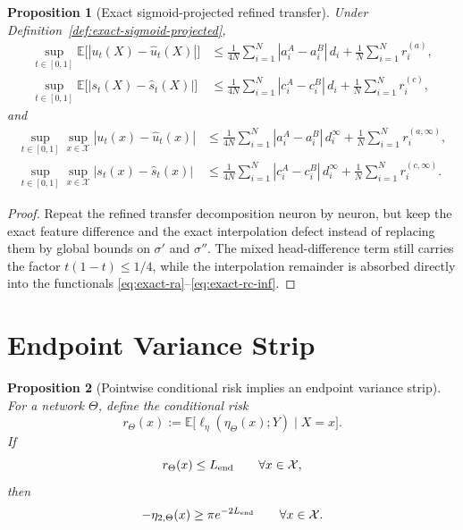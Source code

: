 \documentclass[11pt]{article}
\newtheorem{proposition}{Proposition}
\newcommand{\E}{\mathbb{E}}
\newcommand{\abs}[1]{\left\lvert #1 \right\rvert}
\begin{document}
\begin{proposition}[Exact sigmoid-projected refined transfer]
\label{prop:exact-sigmoid-projected-transfer}
Under Definition~\ref{def:exact-sigmoid-projected},
\begin{align}
  \sup_{t\in[0,1]}\E\big[\abs{u_t(X)-\hat u_t(X)}\big]
  &\le
  \frac{1}{4N}\sum_{i=1}^N \abs{a_i^A-a_i^B}\,d_i
  +
  \frac{1}{N}\sum_{i=1}^N r_i^{(a)},
  \label{eq:exact-transfer-u}
  \\
  \sup_{t\in[0,1]}\E\big[\abs{s_t(X)-\hat s_t(X)}\big]
  &\le
  \frac{1}{4N}\sum_{i=1}^N \abs{c_i^A-c_i^B}\,d_i
  +
  \frac{1}{N}\sum_{i=1}^N r_i^{(c)},
  \label{eq:exact-transfer-s}
\end{align}
and
\begin{align}
  \sup_{t\in[0,1]}\sup_{x\in\mathcal X}\abs{u_t(x)-\hat u_t(x)}
  &\le
  \frac{1}{4N}\sum_{i=1}^N \abs{a_i^A-a_i^B}\,d_i^\infty
  +
  \frac{1}{N}\sum_{i=1}^N r_i^{(a,\infty)},
  \label{eq:exact-transfer-u-inf}
  \\
  \sup_{t\in[0,1]}\sup_{x\in\mathcal X}\abs{s_t(x)-\hat s_t(x)}
  &\le
  \frac{1}{4N}\sum_{i=1}^N \abs{c_i^A-c_i^B}\,d_i^\infty
  +
  \frac{1}{N}\sum_{i=1}^N r_i^{(c,\infty)}.
  \label{eq:exact-transfer-s-inf}
\end{align}
\end{proposition}

\begin{proof}
Repeat the refined transfer decomposition neuron by neuron, but keep the exact
feature difference and the exact interpolation defect instead of replacing them
by global bounds on $\sigma'$ and $\sigma''$. The mixed head-difference term
still carries the factor $t(1-t)\le 1/4$, while the interpolation remainder is
absorbed directly into the functionals
\eqref{eq:exact-ra}--\eqref{eq:exact-rc-inf}.
\end{proof}

\section{Endpoint Variance Strip}

\begin{proposition}[Pointwise conditional risk implies an endpoint variance strip]
\label{prop:conditional-risk-strip}
For a network $\Theta$, define the conditional risk
\[
  r_\Theta(x):=\E\big[\ell_\eta(\eta_\Theta(x);Y)\mid X=x\big].
\]
If
\[
  r_\Theta(x)\le L_{\rm end}
  \qquad
  \forall x\in\mathcal X,
\]
then
\[
  -\eta_{2,\Theta}(x)\ge \pi e^{-2L_{\rm end}}
  \qquad
  \forall x\in\mathcal X.
\]
\end{proposition}
\end{document}
